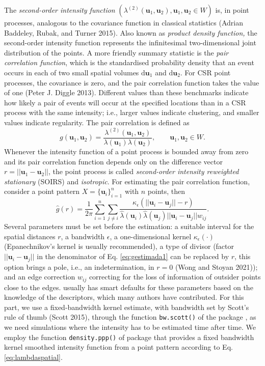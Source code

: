 The \emph{second-order intensity function} \((\lambda^{(2)}(\mathbf{u}_1,\mathbf{u}_2), \mathbf{u}_1,\mathbf{u}_2\in W)\) is, in point processes, analogous to the covariance function in classical statistics (Adrian Baddeley, Rubak, and Turner 2015). Also known as \emph{product density function,} the second-order intensity function represents the infinitesimal two-dimensional joint distribution of the points. A more friendly summary statistic is the \emph{pair correlation function}, which is the standardised probability density that an event occurs in each of two small spatial volumes \(\text{d} \mathbf{u}_1\) and \(\text{d} \mathbf{u}_2\). For CSR point processes, the covariance is zero, and the pair correlation function takes the value of one (Peter J. Diggle 2013). Different values than these benchmarks indicate how likely a pair of events will occur at the specified locations than in a CSR process with the same intensity; i.e., larger values indicate clustering, and smaller values indicate regularity. The pair correlation is defined as
\begin{equation}
    g(\mathbf{u}_1,\mathbf{u}_2)=\frac{\lambda^{(2)}(\mathbf{u}_1,\mathbf{u}_2)}{\lambda(\mathbf{u}_1)\lambda(\mathbf{u}_2)}, \qquad \mathbf{u}_1,\mathbf{u}_2\in W.
    \label{eq:spatialpcf}
\end{equation}
Whenever the intensity function of a point process is bounded away from zero and its pair correlation function depends only on the difference vector \(r =||\mathbf{u}_1 - \mathbf{u}_2||\), the point process is called \emph{second-order intensity reweighted stationary} (SOIRS) and \emph{isotropic}. For estimating the pair correlation function, consider a point pattern \(X=\{\mathbf{u}_{i}\}_{i=1}^n\) with \(n\) points, then
\begin{equation}
    \hat{g}(r)=\frac{1}{2\pi} \sum_{i=1}^n \sum_{j\neq i}
    \frac{\kappa_{\epsilon}(||\mathbf{u}_{i}-\mathbf{u}_{j}||- r)}{\hat{\lambda} ( \mathbf{u}_{i}) \hat{\lambda} (\mathbf{u}_{j}) ||\mathbf{u}_{i}-\mathbf{u}_{j}|| w_{ij}}.
    \label{eq:gestimada1}
\end{equation}
Several parameters must be set before the estimation: a suitable interval for the spatial distances \(r\), a bandwidth \(\epsilon\), a one-dimensional kernel \(\kappa_{\epsilon}(\cdot)\) (Epanechnikov's kernel is usually recommended), a type of divisor (factor \(||\mathbf{u}_{i}-\mathbf{u}_{j}||\) in the denominator of Eq. \eqref{eq:gestimada1} can be replaced by \(r\), this option brings a pole, i.e., an indetermination, in \(r=0\) (Wong and Stoyan 2021)); and an edge correction \(w_{ij}\) correcting for the loss of information of outsider points close to the edges.  usually has smart defaults for these parameters based on the knowledge of the descriptors, which many authors have contributed. For this part, we use a fixed-bandwidth kernel estimate, with bandwidth set by Scott's rule of thumb (Scott 2015), through the function \texttt{bw.scott()} of the package , as we need simulations where the intensity has to be estimated time after time. We employ the function \texttt{density.ppp()} of package  that provides a fixed bandwidth kernel smoothed intensity function from a point pattern according to Eq. \eqref{eq:lambdaspatial}.


